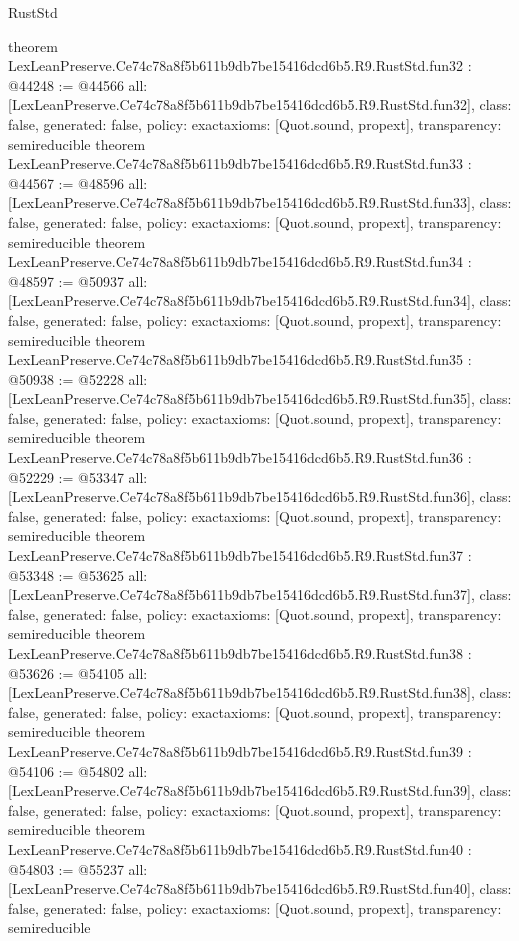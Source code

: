 \begin{lexlean}{RustStd}
\begin{coremodule}
{}
theorem LexLeanPreserve.Ce74c78a8f5b611b9db7be15416dcd6b5.R9.RustStd.fun32 : @44248 := @44566 {
  all: [LexLeanPreserve.Ce74c78a8f5b611b9db7be15416dcd6b5.R9.RustStd.fun32],
  class: false,
  generated: false,
  policy: exact{axioms: [Quot.sound, propext]},
  transparency: semireducible
}
theorem LexLeanPreserve.Ce74c78a8f5b611b9db7be15416dcd6b5.R9.RustStd.fun33 : @44567 := @48596 {
  all: [LexLeanPreserve.Ce74c78a8f5b611b9db7be15416dcd6b5.R9.RustStd.fun33],
  class: false,
  generated: false,
  policy: exact{axioms: [Quot.sound, propext]},
  transparency: semireducible
}
theorem LexLeanPreserve.Ce74c78a8f5b611b9db7be15416dcd6b5.R9.RustStd.fun34 : @48597 := @50937 {
  all: [LexLeanPreserve.Ce74c78a8f5b611b9db7be15416dcd6b5.R9.RustStd.fun34],
  class: false,
  generated: false,
  policy: exact{axioms: [Quot.sound, propext]},
  transparency: semireducible
}
theorem LexLeanPreserve.Ce74c78a8f5b611b9db7be15416dcd6b5.R9.RustStd.fun35 : @50938 := @52228 {
  all: [LexLeanPreserve.Ce74c78a8f5b611b9db7be15416dcd6b5.R9.RustStd.fun35],
  class: false,
  generated: false,
  policy: exact{axioms: [Quot.sound, propext]},
  transparency: semireducible
}
theorem LexLeanPreserve.Ce74c78a8f5b611b9db7be15416dcd6b5.R9.RustStd.fun36 : @52229 := @53347 {
  all: [LexLeanPreserve.Ce74c78a8f5b611b9db7be15416dcd6b5.R9.RustStd.fun36],
  class: false,
  generated: false,
  policy: exact{axioms: [Quot.sound, propext]},
  transparency: semireducible
}
theorem LexLeanPreserve.Ce74c78a8f5b611b9db7be15416dcd6b5.R9.RustStd.fun37 : @53348 := @53625 {
  all: [LexLeanPreserve.Ce74c78a8f5b611b9db7be15416dcd6b5.R9.RustStd.fun37],
  class: false,
  generated: false,
  policy: exact{axioms: [Quot.sound, propext]},
  transparency: semireducible
}
theorem LexLeanPreserve.Ce74c78a8f5b611b9db7be15416dcd6b5.R9.RustStd.fun38 : @53626 := @54105 {
  all: [LexLeanPreserve.Ce74c78a8f5b611b9db7be15416dcd6b5.R9.RustStd.fun38],
  class: false,
  generated: false,
  policy: exact{axioms: [Quot.sound, propext]},
  transparency: semireducible
}
theorem LexLeanPreserve.Ce74c78a8f5b611b9db7be15416dcd6b5.R9.RustStd.fun39 : @54106 := @54802 {
  all: [LexLeanPreserve.Ce74c78a8f5b611b9db7be15416dcd6b5.R9.RustStd.fun39],
  class: false,
  generated: false,
  policy: exact{axioms: [Quot.sound, propext]},
  transparency: semireducible
}
theorem LexLeanPreserve.Ce74c78a8f5b611b9db7be15416dcd6b5.R9.RustStd.fun40 : @54803 := @55237 {
  all: [LexLeanPreserve.Ce74c78a8f5b611b9db7be15416dcd6b5.R9.RustStd.fun40],
  class: false,
  generated: false,
  policy: exact{axioms: [Quot.sound, propext]},
  transparency: semireducible
}
\end{coremodule}
\end{lexlean}
